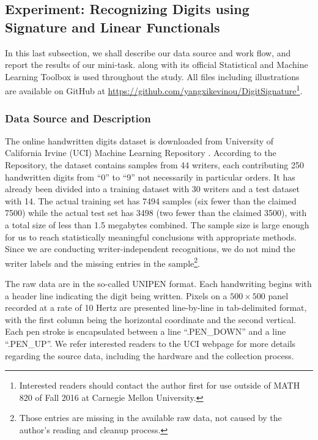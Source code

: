 \documentclass[fleqn]{article}
\theoremstyle{definition}
\theoremstyle{remark}
\begin{document}
\subsection{Experiment: Recognizing Digits using Signature and Linear Functionals}
In this last subsection, we shall describe our data source and work flow, and report the results of our mini-task. \citet{MATLAB:2009} along with its official Statistical and Machine Learning Toolbox is used throughout the study. All files including illustrations are available on GitHub at \url{https://github.com/yangxikevinou/DigitSignature}\footnote{Interested readers should contact the author first for use outside of MATH 820 of Fall 2016 at Carnegie Mellon University.}.

\subsubsection{Data Source and Description}
The online handwritten digits dataset is downloaded from University of California Irvine (UCI) Machine Learning Repository \cite{UJIdigit}. According to the Repository, the dataset contains samples from 44 writers, each contributing 250 handwritten digits from ``0'' to ``9'' not necessarily in particular orders. It has already been divided into a training dataset with 30 writers and a test dataset with 14. The actual training set has 7494 samples (six fewer than the claimed 7500) while the actual test set has 3498 (two fewer than the claimed 3500), with a total size of less than 1.5 megabytes combined. The sample size is large enough for us to reach statistically meaningful conclusions with appropriate methods. Since we are conducting writer-independent recognitions, we do not mind the writer labels and the missing entries in the sample\footnote{Those entries are missing in the available raw data, not caused by the author's reading and cleanup process.}.

\par
The raw data are in the so-called UNIPEN format. Each handwriting begins with a header line indicating the digit being written. Pixels on a $500\times 500$ panel recorded at a rate of 10 Hertz are presented line-by-line in tab-delimited format, with the first column being the horizontal coordinate and the second vertical. Each pen stroke is encapsulated between a line ``.PEN\_DOWN'' and a line ``.PEN\_UP''. We refer interested readers to the UCI webpage \cite{UJIdigit} for more details regarding the source data, including the hardware and the collection process.
\end{document}
